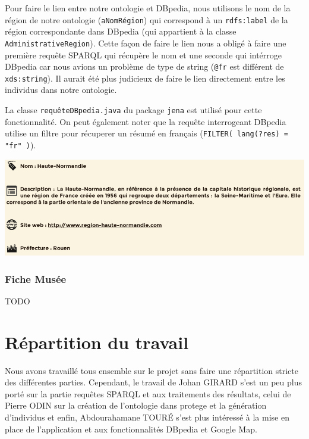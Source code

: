 \documentclass{article}
\begin{document}
Pour faire le lien entre notre ontologie et DBpedia, nous utilisons le nom de la
région de notre ontologie (\texttt{aNomRégion}) qui correspond à un
\texttt{rdfs:label} de la région correspondante dans DBpedia (qui appartient à
la classe \texttt{AdministrativeRegion}).
Cette façon de faire le lien nous a obligé à faire une première requête SPARQL
qui récupère le nom et une seconde qui intérroge DBpedia car nous avions un
problème de type de string (\texttt{@fr} est différent de \texttt{xds:string}).
Il aurait été plus judicieux de faire le lien directement entre les individus dans notre ontologie.

\vspace{0.3cm}

La classe \texttt{requêteDBpedia.java} du package \texttt{jena} est utilisé pour
cette fonctionnalité. On peut également noter que la requête interrogeant
DBpedia utilise un filtre pour récuperer un résumé en français (\texttt{FILTER(
lang(?res) = "fr" )}).

\begin{center}
\includegraphics[width=14cm]{trouveMuseeRegion.png}
\end{center}

\subsubsection{Fiche Musée}

TODO

\section{Répartition du travail}

Nous avons travaillé tous ensemble sur le projet sans faire une répartition
stricte des différentes parties. Cependant, le travail de Johan GIRARD s'est un
peu plus porté sur la partie requêtes SPARQL et aux traitements
des résultats, celui de Pierre ODIN sur la création de l'ontologie dans protege et la génération d'individus et
enfin, Abdourahamane TOURÉ s'est plus intéressé à la mise en place de
l'application et aux fonctionnalités DBpedia et Google Map.
\end{document}

